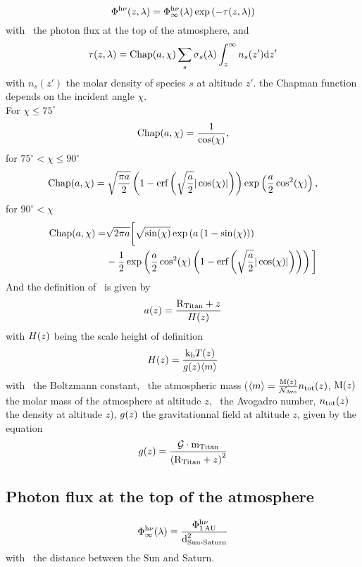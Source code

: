 \begin{equation}
\Phi^{\mathrm{h}\nu}(z,\lambda) = \Phi^{\mathrm{h}\nu}_\infty(\lambda) \exp\left(-\tau(z,\lambda)\right)
\end{equation}
with \fhvtop\ the photon flux at the top of the atmosphere, and
\begin{equation}
\tau(z,\lambda) = \text{Chap}(a,\chi)\sum_s\sigma_s(\lambda)\int_z^\infty n_s(z')\mathrm{d} z'
\end{equation}
with $n_s(z')$ the molar density of species $s$ at altitude $z'$.
the Chapman function depends on the
incident angle $\chi$.\\
For $\chi \le 75^\circ$
\begin{equation}
\text{Chap}(a,\chi) =  \frac{1}{\cos(\chi)},
\end{equation}
for $75^\circ < \chi \le 90^\circ$
\begin{equation}
\text{Chap}(a,\chi) = \sqrt{\frac{\pi a}{2}} 
                \left(1 - \text{erf}\left(\sqrt{\frac{a}{2}}|\cos(\chi)|\right)\right)\exp\left(\frac{a}{2}\cos^2(\chi)\right),
\end{equation}
for $90^\circ < \chi$
\begin{equation}
\begin{split}
\text{Chap}(a,\chi) = & \sqrt{2\pi a}\bigg[\sqrt{\sin(\chi)}\exp\left(a\left(1-\sin(\chi)\right)\right) \\
           &  -\frac{1}{2}\exp\left(\frac{a}{2}\cos^2(\chi)\left(1-\text{erf}\left(\sqrt{\frac{a}{2}}|\cos(\chi)|\right)\right)\right)\bigg]
\end{split}
\end{equation}
And the definition of \x\ is given by
\begin{equation}
a(z) = \frac{\text{R}_\text{Titan} + z}{H(z)}
\end{equation}
with $H(z)$ being the scale height of definition
\begin{equation}
H(z) = \frac{\text{k}_\text{b} T(z)}{g(z)\langle m\rangle}
\end{equation}
with \kb\ the Boltzmann constant, 
\mean{\mass}\ the atmospheric mass ($\langle m\rangle = \frac{\text{M}(z)}{\mathcal{N}_\text{Avo}}n_\text{tot}(z)$, 
$\text{M}(z)$ the molar mass of the atmosphere at altitude $z$,
\Nav\ the Avogadro number, $n_\text{tot}(z)$ the density at altitude $z$), 
$g(z)$ the gravitationnal field at altitude $z$, given by the equation
\begin{equation}
g(z) = \frac{\mathcal{G}\cdot\text{m}_\text{Titan}}{\left(\text{R}_\text{Titan} + z\right)^2}
\label{gfield}
\end{equation}

\subsection{Photon flux at the top of the atmosphere}
\begin{equation}
\Phi^{\mathrm{h}\nu}_\infty(\lambda) = \frac{\Phi^{\mathrm{h}\nu}_\text{1\,AU}}{\text{d}_\text{Sun-Saturn}^2}
\end{equation}
with \dSS\ the distance between the Sun and Saturn.

